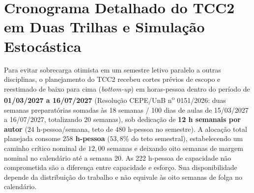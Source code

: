 \documentclass[12pt,openany,oneside,a4paper,english,brazilian,sumario=tradicional]{abntex2}
\begin{document}
\section{Cronograma Detalhado do TCC2 em Duas Trilhas e Simulação Estocástica}

Para evitar sobrecarga otimista em um semestre letivo paralelo a outras disciplinas, o planejamento do TCC2 recebeu cortes prévios de escopo e reestimado de baixo para cima (\textit{bottom-up}) em horas-pessoa dentro do período de \textbf{01/03/2027 a 16/07/2027} (Resolução CEPE/UnB n\textsuperscript{o} 0151/2026: duas semanas preparatórias somadas às 18 semanas / 100 dias de aulas de 15/03/2027 a 16/07/2027, totalizando $20$ semanas), sob dedicação de \textbf{12 h semanais por autor} ($24$ h-pessoa/semana, teto de $480$ h-pessoa no semestre). A alocação total planejada consome \textbf{$258$ h-pessoa} ($53{,}8\%$ do teto semestral), estabelecendo um caminho crítico nominal de $12{,}00$ semanas e deixando oito semanas de margem nominal no calendário até a semana 20.
As 222 h-pessoa de capacidade não comprometida são a diferença entre capacidade e esforço. Sua disponibilidade depende da distribuição do trabalho e não equivale às oito semanas de folga no calendário.
\end{document}
